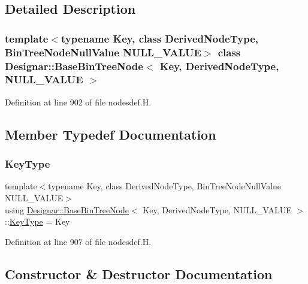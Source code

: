 \subsection{Detailed Description}
\subsubsection*{template$<$typename Key, class Derived\+Node\+Type, Bin\+Tree\+Node\+Null\+Value N\+U\+L\+L\+\_\+\+V\+A\+L\+UE$>$\newline
class Designar\+::\+Base\+Bin\+Tree\+Node$<$ Key, Derived\+Node\+Type, N\+U\+L\+L\+\_\+\+V\+A\+L\+U\+E $>$}



Definition at line 902 of file nodesdef.\+H.



\subsection{Member Typedef Documentation}
\mbox{\label{class_designar_1_1_base_bin_tree_node_adc177cc1f4ed5bb9baf467a2ff6e4e85}} 
\subsubsection{\texorpdfstring{Key\+Type}{KeyType}}
{\footnotesize\ttfamily template$<$typename Key, class Derived\+Node\+Type, Bin\+Tree\+Node\+Null\+Value N\+U\+L\+L\+\_\+\+V\+A\+L\+UE$>$ \\
using \hyperlink{class_designar_1_1_base_bin_tree_node}{Designar\+::\+Base\+Bin\+Tree\+Node}$<$ Key, Derived\+Node\+Type, N\+U\+L\+L\+\_\+\+V\+A\+L\+UE $>$\+::\hyperlink{class_designar_1_1_base_bin_tree_node_adc177cc1f4ed5bb9baf467a2ff6e4e85}{Key\+Type} =  Key}



Definition at line 907 of file nodesdef.\+H.



\subsection{Constructor \& Destructor Documentation}
\mbox{\label{class_designar_1_1_base_bin_tree_node_a2779b1f30e23443940aaa0ddfec895be}} 

